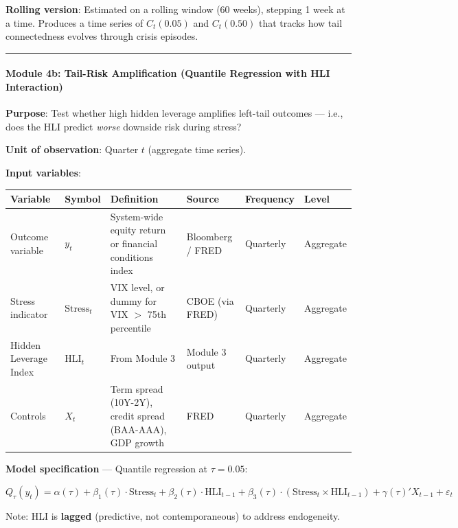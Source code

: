 \documentclass[11pt,a4paper]{article}
\begin{document}
\textbf{Rolling version}: Estimated on a rolling window (60 weeks), stepping 1 week at a time. Produces a time series of $C_t(0.05)$ and $C_t(0.50)$ that tracks how tail connectedness evolves through crisis episodes.


\bigskip\noindent\rule{\textwidth}{0.4pt}\bigskip


\paragraph{Module 4b: Tail-Risk Amplification (Quantile Regression with HLI Interaction)}

\textbf{Purpose}: Test whether high hidden leverage amplifies left-tail outcomes --- i.e., does the HLI predict \textit{worse} downside risk during stress?

\textbf{Unit of observation}: Quarter $t$ (aggregate time series).

\textbf{Input variables}:


{\small
\begin{longtable}{|p{}|p{}|p{}|p{}|p{}|p{}|}
\hline
\textbf{Variable} & \textbf{Symbol} & \textbf{Definition} & \textbf{Source} & \textbf{Frequency} & \textbf{Level} \\
\hline
\endhead
Outcome variable & $y_t$ & System-wide equity return or financial conditions index & Bloomberg / FRED & Quarterly & Aggregate \\
\hline
Stress indicator & $\text{Stress}_t$ & VIX level, or dummy for VIX $>$ 75th percentile & CBOE (via FRED) & Quarterly & Aggregate \\
\hline
Hidden Leverage Index & $\text{HLI}_t$ & From Module 3 & Module 3 output & Quarterly & Aggregate \\
\hline
Controls & $X_t$ & Term spread (10Y-2Y), credit spread (BAA-AAA), GDP growth & FRED & Quarterly & Aggregate \\
\hline
\end{longtable}
}

\textbf{Model specification} --- Quantile regression at $\tau = 0.05$:

\[Q_{\tau}(y_t) = \alpha(\tau) + \beta_1(\tau) \cdot \text{Stress}_t + \beta_2(\tau) \cdot \text{HLI}_{t-1} + \beta_3(\tau) \cdot (\text{Stress}_t \times \text{HLI}_{t-1}) + \gamma(\tau)' X_{t-1} + \varepsilon_t\]

Note: HLI is \textbf{lagged} (predictive, not contemporaneous) to address endogeneity.
\end{document}
